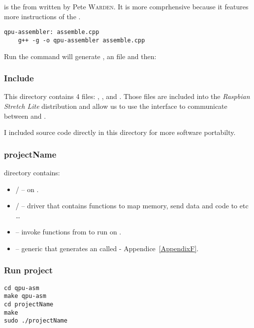  is the  from  written by Pete \textsc{Warden}. It is more comprhensive because it features more instructions of the \vc.

\begin{lstlisting}
qpu-assembler: assemble.cpp
	g++ -g -o qpu-assembler assemble.cpp
\end{lstlisting}

Run the  command will generate , an  file and then:\\
\begin{center}
\end{center}


\subsubsection{Include}

This directory contains 4 files: , ,  and .
Those files are included into the \emph{Raspbian Stretch Lite} distribution and allow us to use the \mail{} interface to communicate between \vc{} and \cpu.

I included \mail{} source code directly in this directory for more software portabilty.

\subsubsection{projectName}

 directory contains:
\begin{itemize}
	\item {}/ --  on \vc.
	\item {}/ --  driver that contains functions to map memory, send data and code to \vc{} etc \ldots
	\item {} -- invoke functions from  to run  on \vc.
	\item {} -- generic  that generates an  called  - Appendice~\ref{AppendixF}.
\end{itemize}


\subsubsection{Run project}
\begin{lstlisting}
cd qpu-asm
make qpu-asm
cd projectName
make
sudo ./projectName
\end{lstlisting}


